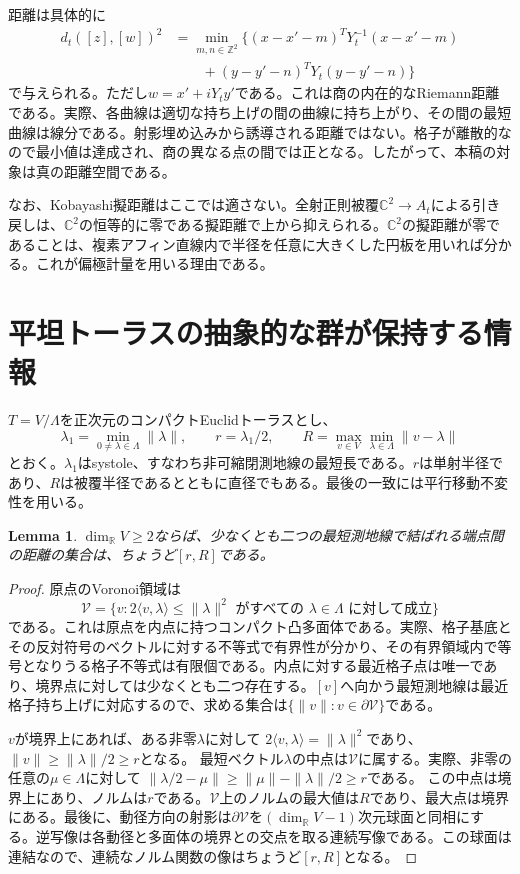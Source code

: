 \documentclass[12pt]{amsart}
\newcommand{\LemmaName}{Lemma}
\newtheorem{lem}[thm]{\LemmaName}
\theoremstyle{definition}
\theoremstyle{remark}
\numberwithin{equation}{section}
\newcommand{\R}{\mathbb{R}}
\newcommand{\Z}{\mathbb{Z}}
\newcommand{\C}{\mathbb{C}}
\begin{document}
距離は具体的に
\begin{equation}\label{ja:distance}
\begin{aligned}
d_t([z],[w])^2&=\min_{m,n\in\Z^2}\bigl\{
(x-x'-m)^TY_t^{-1}(x-x'-m)\\
&\qquad +(y-y'-n)^TY_t(y-y'-n)\bigr\}
\end{aligned}
\end{equation}
で与えられる。ただし$w=x'+iY_ty'$である。これは商の内在的なRiemann距離である。実際、各曲線は適切な持ち上げの間の曲線に持ち上がり、その間の最短曲線は線分である。射影埋め込みから誘導される距離ではない。格子が離散的なので最小値は達成され、商の異なる点の間では正となる。したがって、本稿の対象は真の距離空間である。

なお、Kobayashi擬距離はここでは適さない。全射正則被覆$\C^2\to A_t$による引き戻しは、$\C^2$の恒等的に零である擬距離で上から抑えられる。$\C^2$の擬距離が零であることは、複素アフィン直線内で半径を任意に大きくした円板を用いれば分かる。これが偏極計量を用いる理由である。

\section{平坦トーラスの抽象的な群が保持する情報}
$T=V/\Lambda$を正次元のコンパクトEuclidトーラスとし、
\[
\lambda_1=\min_{0\ne\lambda\in\Lambda}\|\lambda\|,
\qquad r=\lambda_1/2,
\qquad R=\max_{v\in V}\min_{\lambda\in\Lambda}\|v-\lambda\|
\]
とおく。$\lambda_1$はsystole、すなわち非可縮閉測地線の最短長である。$r$は単射半径であり、$R$は被覆半径であるとともに直径でもある。最後の一致には平行移動不変性を用いる。

\begin{lem}\label{ja:cut}
$\dim_\R V\geq2$ならば、少なくとも二つの最短測地線で結ばれる端点間の距離の集合は、ちょうど$[r,R]$である。
\end{lem}
\begin{proof}
原点のVoronoi領域は
\[
\mathcal V=\{v:2\langle v,\lambda\rangle\leq\|\lambda\|^2
\text{ がすべての }\lambda\in\Lambda\text{ に対して成立}\}
\]
である。これは原点を内点に持つコンパクト凸多面体である。実際、格子基底とその反対符号のベクトルに対する不等式で有界性が分かり、その有界領域内で等号となりうる格子不等式は有限個である。内点に対する最近格子点は唯一であり、境界点に対しては少なくとも二つ存在する。$[v]$へ向かう最短測地線は最近格子持ち上げに対応するので、求める集合は$\{\|v\|:v\in\partial\mathcal V\}$である。

$v$が境界上にあれば、ある非零$\lambda$に対して
$2\langle v,\lambda\rangle=\|\lambda\|^2$であり、
$\|v\|\geq\|\lambda\|/2\geq r$となる。
最短ベクトル$\lambda$の中点は$\mathcal V$に属する。実際、非零の任意の$\mu\in\Lambda$に対して
$\|\lambda/2-\mu\|\geq\|\mu\|-\|\lambda\|/2\geq r$である。
この中点は境界上にあり、ノルムは$r$である。$\mathcal V$上のノルムの最大値は$R$であり、最大点は境界にある。最後に、動径方向の射影は$\partial\mathcal V$を$(\dim_\R V-1)$次元球面と同相にする。逆写像は各動径と多面体の境界との交点を取る連続写像である。この球面は連結なので、連続なノルム関数の像はちょうど$[r,R]$となる。
\end{proof}
\end{document}
